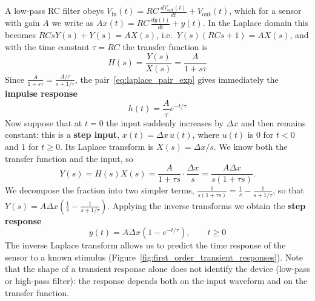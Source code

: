 \documentclass[letterpaper,11pt,leqno]{book}
\begin{document}
A low-pass RC filter obeys $V_{\text{in}}(t) = RC\,\frac{dV_{\text{out}}(t)}{dt} + V_{\text{out}}(t)$, which for a sensor with gain $A$ we write as $Ax(t) = RC\,\frac{dy(t)}{dt} + y(t)$. In the Laplace domain this becomes $RCsY(s) + Y(s) = AX(s)$, i.e.\ $Y(s)(RCs + 1) = AX(s)$, and with the time constant $\tau = RC$ the transfer function is
\begin{equation}
\boxed{H(s) = \frac{Y(s)}{X(s)} = \frac{A}{1 + s\tau}}
\label{eq:first_order_transfer_function}
\end{equation}
Since $\frac{A}{1 + s\tau} = \frac{A/\tau}{s + 1/\tau}$, the pair~\eqref{eq:laplace_pair_exp} gives immediately the \textbf{impulse response}
\begin{equation}
\boxed{h(t) = \frac{A}{\tau}e^{-t/\tau}}
\label{eq:impulse_response_first_order}
\end{equation}
Now suppose that at $t = 0$ the input suddenly increases by $\Delta x$ and then remains constant: this is a \textbf{step input}, $x(t) = \Delta x\,u(t)$, where $u(t)$ is $0$ for $t < 0$ and $1$ for $t \ge 0$. Its Laplace transform is $X(s) = \Delta x/s$. We know both the transfer function and the input, so
\begin{equation}
Y(s) = H(s)X(s) = \frac{A}{1 + \tau s}\cdot\frac{\Delta x}{s} = \frac{A\Delta x}{s(1 + \tau s)}.
\end{equation}
We decompose the fraction into two simpler terms, $\frac{1}{s(1 + \tau s)} = \frac{1}{s} - \frac{1}{s + 1/\tau}$, so that $Y(s) = A\Delta x\left(\frac{1}{s} - \frac{1}{s + 1/\tau}\right)$. Applying the inverse transforms we obtain the \textbf{step response}
\begin{equation}
\boxed{y(t) = A\Delta x\left(1 - e^{-t/\tau}\right), \qquad t \ge 0}
\label{eq:first_order_step_response}
\end{equation}
The inverse Laplace transform allows us to predict the time response of the sensor to a known stimulus (Figure~\ref{fig:first_order_transient_responses}). Note that the shape of a transient response alone does not identify the device (low-pass or high-pass filter): the response depends both on the input waveform and on the transfer function.
\end{document}
